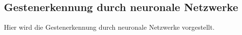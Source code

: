 \subsection{Gestenerkennung durch neuronale Netzwerke}
Hier wird die Gestenerkennung durch neuronale Netzwerke vorgestellt.
